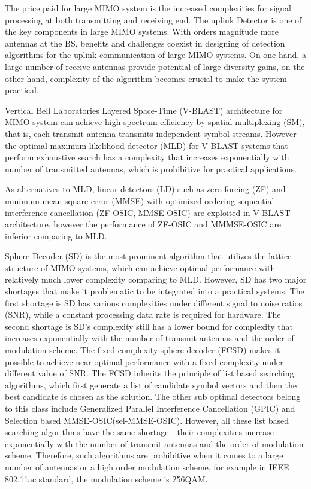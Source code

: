 \documentclass[12pt, draftclsnofoot, onecolumn]{IEEEtran}
\begin{document}
\begin{spacing}{2}
  The price paid for large MIMO system is the increased complexities for signal processing at both transmitting and receiving end. The uplink Detector is one of the key components in large MIMO systems. With orders magnitude more antennas at the BS, benefits and challenges coexist in designing of detection algorithms for the uplink communication of large MIMO systems. On one hand, a large number of receive antennas provide potential of large diversity gains, on the other hand, complexity of the algorithm becomes crucial to make the system practical. 
  
Vertical Bell Laboratories Layered Space-Time (V-BLAST) architecture for MIMO system can achieve high spectrum efficiency by spatial multiplexing (SM), that is, each transmit antenna transmits independent symbol streams. However the optimal maximum likelihood detector (MLD) for V-BLAST systems that perform exhaustive search has a complexity that increases exponentially with number of transmitted antennas, which is prohibitive for practical applications. 

As alternatives to MLD, linear detectors (LD) such as zero-forcing (ZF) and minimum mean square error (MMSE) with optimized ordering sequential interference cancellation (ZF-OSIC, MMSE-OSIC) are exploited in V-BLAST architecture\cite{wolniansky1998v}\cite{foschini1999simplified}\cite{benesty2003fast},  however the performance of ZF-OSIC and MMMSE-OSIC are inferior comparing to MLD.
   
Sphere Decoder (SD)\cite{damen2003maximum} is the most prominent algorithm that utilizes the lattice structure of MIMO systems, which can achieve optimal performance with relatively much lower complexity comparing to MLD. However, SD has two major shortages that make it problematic to be integrated into a practical systems. The first shortage is SD has various complexities under different signal to noise ratios (SNR), while a constant processing data rate is required for hardware. The second shortage is SD's complexity still has a lower bound for complexity that increases exponentially with the number of transmit antennas and the order of modulation scheme\cite{jalden2005complexity}.
The fixed complexity sphere decoder (FCSD)\cite{barbero2008fixing} makes it possible to achieve near optimal performance with a fixed complexity under different value of SNR. The FCSD inherits the principle of list based searching algorithms, which first generate a list of candidate symbol vectors and then the best candidate is chosen as the solution. The other sub optimal detectors belong to this class include Generalized Parallel Interference Cancellation (GPIC)\cite{luo2008generalized} and Selection based MMSE-OSIC(sel-MMSE-OSIC)\cite{radji2009interference}. However, all these list based searching algorithms have the same shortage - their complexities increase exponentially with the number of transmit antennas and the order of modulation scheme\cite{radji2009interference}. Therefore, such algorithms are prohibitive when it comes to a large number of antennas or a high order modulation scheme, for example in IEEE 802.11ac standard\cite{IEEE802.11ac}, the modulation scheme is 256QAM. 
 

\end{spacing}
\end{document}
